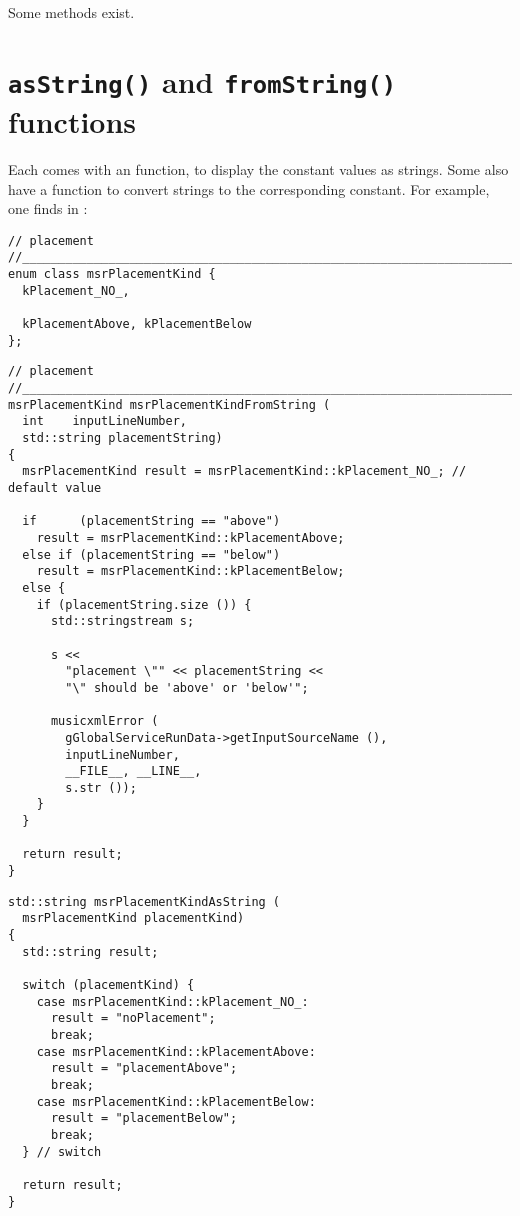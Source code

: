 Some  methods exist. %


\section{{\tt *asString()} and {\tt *fromString()} functions}

Each \enumType comes with an  function, to display the constant values as strings. Some also have a  function to convert strings to the corresponding constant. For example, one finds in :
\begin{lstlisting}[language=CPlusPlus]
// placement
//______________________________________________________________________________
enum class msrPlacementKind {
  kPlacement_NO_,

  kPlacementAbove, kPlacementBelow
};
\end{lstlisting}

\begin{lstlisting}[language=CPlusPlus]
// placement
//______________________________________________________________________________
msrPlacementKind msrPlacementKindFromString (
  int    inputLineNumber,
  std::string placementString)
{
  msrPlacementKind result = msrPlacementKind::kPlacement_NO_; // default value

  if      (placementString == "above")
    result = msrPlacementKind::kPlacementAbove;
  else if (placementString == "below")
    result = msrPlacementKind::kPlacementBelow;
  else {
    if (placementString.size ()) {
      std::stringstream s;

      s <<
        "placement \"" << placementString <<
        "\" should be 'above' or 'below'";

      musicxmlError (
        gGlobalServiceRunData->getInputSourceName (),
        inputLineNumber,
        __FILE__, __LINE__,
        s.str ());
    }
  }

  return result;
}
\end{lstlisting}

\begin{lstlisting}[language=CPlusPlus]
std::string msrPlacementKindAsString (
  msrPlacementKind placementKind)
{
  std::string result;

  switch (placementKind) {
    case msrPlacementKind::kPlacement_NO_:
      result = "noPlacement";
      break;
    case msrPlacementKind::kPlacementAbove:
      result = "placementAbove";
      break;
    case msrPlacementKind::kPlacementBelow:
      result = "placementBelow";
      break;
  } // switch

  return result;
}
\end{lstlisting}

